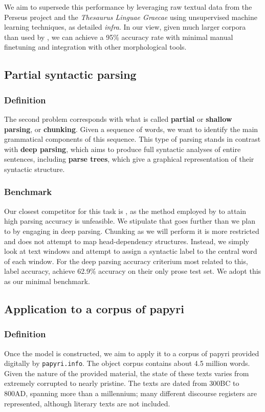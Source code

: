 We aim to supersede this performance by leveraging raw textual data
from the Perseus project and the \textit{Thesaurus Linguae Graecae}
using unsupervised machine learning techniques, as detailed
\textit{infra}. In our view, given much larger corpora than used by
\citeauthor{dik2008}, we can achieve a 95\% accuracy rate with minimal
manual finetuning and integration with other morphological tools.

\subsection{Partial syntactic parsing}
\subsubsection{Definition}
The second problem corresponds with what is called \textbf{partial} or
\textbf{shallow parsing}, or \textbf{chunking}. Given a sequence of
words, we want to identify the main grammatical components of this
sequence.  This type of parsing stands in contrast with \textbf{deep
parsing}, which aims to produce full syntactic analyses of entire
sentences, including \textbf{parse trees}, which give a graphical
representation of their syntactic structure.

\subsubsection{Benchmark}
Our closest competitor for this task is \cite{mambrini2012}, as 
the method employed by \cite{lee2010dependency} to attain high parsing
accuracy is unfeasible. We stipulate that \cite{mambrini2012} goes
further than we plan to by engaging in deep parsing. Chunking as we
will perform it is more restricted and does not attempt to map
head-dependency structures. Instead, we simply look at text windows
and attempt to assign a syntactic label to the central word of each
window. For the deep parsing accuracy criterium most related to this,
label accuracy, \citeauthor{mambrini2012} achieve 62.9\% accuracy on
their only prose test set. We adopt this as our minimal benchmark.

\subsection{Application to a corpus of papyri}
\subsubsection{Definition}
Once the model is constructed, we aim to apply it to a corpus of
papyri provided digitally by \texttt{papyri.info}. The object corpus
contains about 4.5 million words. Given the nature of the provided
material, the state of these texts varies from extremely corrupted to
nearly pristine. The texts are dated from 300BC to 800AD, spanning
more than a millennium; many different discourse registers are
represented, although literary texts are not included.

